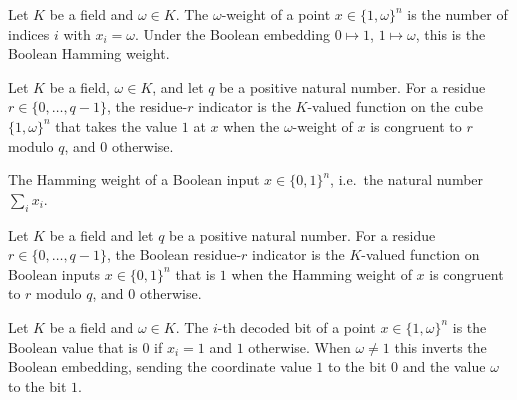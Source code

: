 \begin{definition}
\label{RazborovSmolensky.rootResidueWeight}
\leanok
{}
Let $K$ be a field and $\omega \in K$.  The $\omega$-weight of a point
$x \in \{1,\omega\}^n$ is the number of indices $i$ with $x_i = \omega$.  Under the
Boolean embedding $0 \mapsto 1$, $1 \mapsto \omega$, this is the Boolean Hamming weight.
\end{definition}

\begin{definition}
\label{RazborovSmolensky.rootResidueIndicator}
\leanok
{}
Let $K$ be a field, $\omega \in K$, and let $q$ be a positive natural number.  For a
residue $r \in \{0,\dots,q-1\}$, the residue-$r$ indicator is the $K$-valued function on
the cube $\{1,\omega\}^n$ that takes the value $1$ at $x$ when the $\omega$-weight of $x$
is congruent to $r$ modulo $q$, and $0$ otherwise.
\end{definition}

\begin{definition}
\label{RazborovSmolensky.boolWeight}
\leanok
The Hamming weight of a Boolean input $x \in \{0,1\}^n$, i.e.\ the natural number
$\sum_{i} x_i$.
\end{definition}

\begin{definition}
\label{RazborovSmolensky.boolResidueIndicator}
\leanok
{}
Let $K$ be a field and let $q$ be a positive natural number.  For a residue
$r \in \{0,\dots,q-1\}$, the Boolean residue-$r$ indicator is the $K$-valued function on
Boolean inputs $x \in \{0,1\}^n$ that is $1$ when the Hamming weight of $x$ is congruent
to $r$ modulo $q$, and $0$ otherwise.
\end{definition}

\begin{definition}
\label{RazborovSmolensky.rootCubeBit}
\leanok
{}
Let $K$ be a field and $\omega \in K$.  The $i$-th decoded bit of a point
$x \in \{1,\omega\}^n$ is the Boolean value that is $0$ if $x_i = 1$ and $1$ otherwise.
When $\omega \neq 1$ this inverts the Boolean embedding, sending the coordinate value $1$
to the bit $0$ and the value $\omega$ to the bit $1$.
\end{definition}

